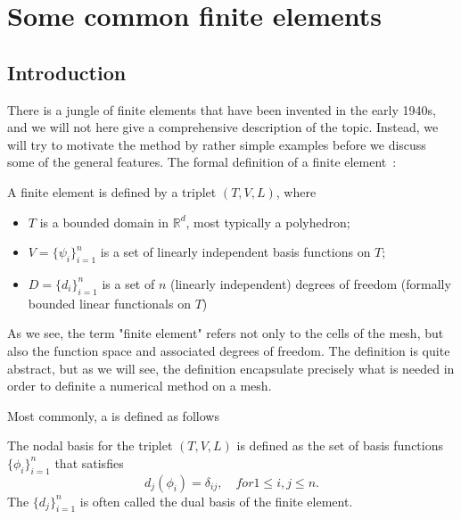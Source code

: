 \chapter{Some common finite elements}
\label{element}

\section{Introduction}

There is a jungle of finite elements that have been invented in the early 1940s, and we
will not here give a comprehensive description of the topic. Instead, we will try to motivate
the method by rather simple examples before we discuss some of the general features. 
The formal definition of a finite element~\cite{ciarlet2002finite}: 

\begin{defin}
A finite element is defined by a triplet $(T, V, L)$, where 
\begin{itemize}
\item $T$ is a bounded domain in $\mathbb{R}^d$, most typically a polyhedron; 
\item $V = \{\psi_i\}_{i=1}^n$ is a set of linearly independent basis functions on $T$; 
\item $D = \{d_i\}^n_{i=1}$ is a set of $n$ (linearly independent) 
  degrees of freedom (formally bounded linear functionals on $T$) 
\end{itemize}
\end{defin}
As we see, the term "finite element" refers not only to the cells of the mesh, but also the function space and associated degrees of freedom. The definition is quite abstract, but as we will see, the definition encapsulate precisely what is needed in order to definite a numerical method on a mesh. 

Most commonly, a  is defined as follows 
\begin{defin}
\label{nodal:basis}
The nodal basis for the triplet  $(T, V, L)$ is defined as the set of basis functions
$\{\phi_i\}^n_{i=1}$ that satisfies  
\[
d_j(\phi_i) = \delta_{ij}, \quad for 1 \le i,j \le n. 
\]
The $\{d_j\}^n_{i=1}$ is often called the dual basis of the finite element.  
\end{defin}


